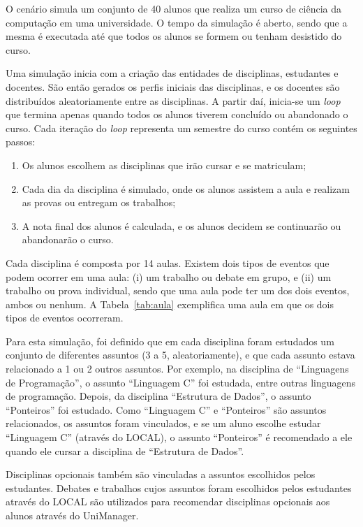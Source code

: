 O cenário simula um conjunto de 40 alunos que realiza um curso de ciência da computação em uma universidade. O tempo da simulação é aberto, sendo que a mesma é executada até que todos os alunos se formem ou tenham desistido do curso.

Uma simulação inicia com a criação das entidades de disciplinas, estudantes e docentes. São então gerados os perfis iniciais das disciplinas, e os docentes são distribuídos aleatoriamente entre as disciplinas. A partir daí, inicia-se um {\em loop} que termina apenas quando todos os alunos tiverem concluído ou abandonado o curso. Cada iteração do {\em loop} representa um semestre do curso contém os seguintes passos:

\begin{enumerate}
  \item Os alunos escolhem as disciplinas que irão cursar e se matriculam;
  \item Cada dia da disciplina é simulado, onde os alunos assistem a aula e realizam as provas ou entregam os trabalhos;
  \item A nota final dos alunos é calculada, e os alunos decidem se continuarão ou abandonarão o curso.
\end{enumerate}

Cada disciplina é composta por 14 aulas. Existem dois tipos de eventos que podem ocorrer em uma aula: (i) um trabalho ou debate em grupo, e (ii) um trabalho ou prova individual, sendo que uma aula pode ter um dos dois eventos, ambos ou nenhum. A Tabela~\ref{tab:aula} exemplifica uma aula em que os dois tipos de eventos ocorreram.

Para esta simulação, foi definido que em cada disciplina foram estudados um conjunto de diferentes assuntos (3 a 5, aleatoriamente), e que cada assunto estava relacionado a 1 ou 2 outros assuntos. Por exemplo, na disciplina de ``Linguagens de Programação'', o assunto ``Linguagem C'' foi estudada, entre outras linguagens de programação. Depois, da disciplina ``Estrutura de Dados'', o assunto ``Ponteiros'' foi estudado. Como ``Linguagem C'' e ``Ponteiros'' são assuntos relacionados, os assuntos foram vinculados, e se um aluno escolhe estudar ``Linguagem C'' (através do LOCAL), o assunto ``Ponteiros'' é recomendado a ele quando ele cursar a disciplina de ``Estrutura de Dados''.

Disciplinas opcionais também são vinculadas a assuntos escolhidos pelos estudantes. Debates e trabalhos cujos assuntos foram escolhidos pelos estudantes através do LOCAL são utilizados para recomendar disciplinas opcionais aos alunos através do UniManager.

